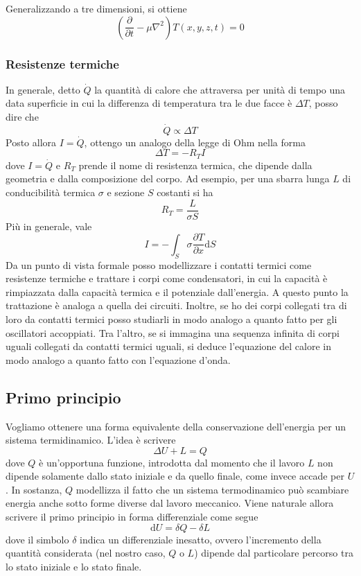 \documentclass[a4paper,11pt]{article}
\begin{document}
\noindent Generalizzando a tre dimensioni, si ottiene
\[\left(\frac{\partial}{\partial t}-\mu\nabla^2\right)T(x,y,z,t)=0\]

\subsubsection{Resistenze termiche}
In generale, detto $\dot{Q}$ la quantità di calore che attraversa per unità di tempo una data superficie in cui la differenza di temperatura tra le due facce è $\Delta T$, posso dire che
\[\dot{Q}\propto \Delta T\]
Posto allora $I=\dot{Q}$, ottengo un analogo della legge di Ohm nella forma
\[\Delta T=-R_TI\]
dove $I=\dot{Q}$ e $R_T$ prende il nome di resistenza termica, che dipende dalla geometria e dalla composizione del corpo. Ad esempio, per una sbarra lunga $L$ di conducibilità termica $\sigma$ e sezione $S$ costanti si ha
\[R_T=\frac{L}{\sigma S}\]
Più in generale, vale
\[I=-\int_{S}\sigma\frac{\partial T}{\partial x}\mathrm{d}S\]
Da un punto di vista formale posso modellizzare i contatti termici come resistenze termiche e trattare i corpi come condensatori, in cui la capacità è rimpiazzata dalla capacità termica e il potenziale dall'energia. A questo punto la trattazione è analoga a quella dei circuiti. Inoltre, se ho dei corpi collegati tra di loro da contatti termici posso studiarli in modo analogo a quanto fatto per gli oscillatori accoppiati. Tra l'altro, se si immagina una sequenza infinita di corpi uguali collegati da contatti termici uguali, si deduce l'equazione del calore in modo analogo a quanto fatto con l'equazione d'onda.

\subsection{Primo principio}
Vogliamo ottenere una forma equivalente della conservazione dell'energia per un sistema termidinamico. L'idea è scrivere 
\[\Delta U+L=Q\]
dove $Q$ è un'opportuna funzione, introdotta dal momento che il lavoro $L$ non dipende solamente dallo stato iniziale e da quello finale, come invece accade per $U$. In sostanza, $Q$ modellizza il fatto che un sistema termodinamico può scambiare energia anche sotto forme diverse dal lavoro meccanico. Viene naturale allora scrivere il primo principio in forma differenziale come segue
\[\mathrm{d}U=\delta Q-\delta L\]
dove il simbolo $\delta$ indica un differenziale inesatto, ovvero l'incremento della quantità considerata (nel nostro caso, $Q$ o $L$) dipende dal particolare percorso tra lo stato iniziale e lo stato finale.
\end{document}
